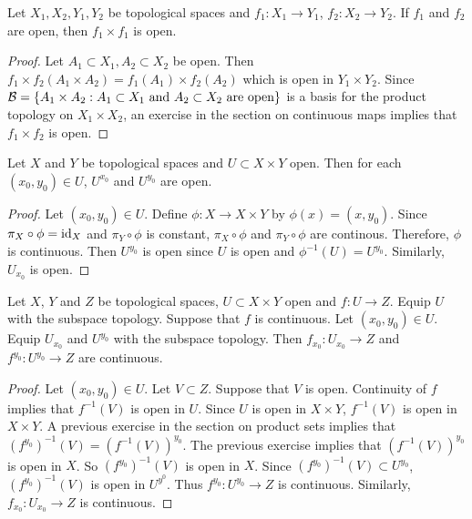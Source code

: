 \documentclass{book}
\begin{document}
	
	\begin{ex}
		Let $X_1, X_2,Y_1,Y_2$ be topological spaces and $f_1:X_1 \rightarrow Y_1$, $f_2:X_2 \rightarrow Y_2$. If $f_1$ and $f_2$ are open, then $f_1 \times f_1$ is open.
	\end{ex}
	
	\begin{proof}
		Let $A_1 \subset X_1, A_2 \subset X_2$ be open. Then $f_1 \times f_2(A_1 \times A_2) = f_1(A_1) \times f_2(A_2)$ which is open in $Y_1 \times Y_2$. Since $\mathcal{B} = \{A_1 \times A_2:  \text{$A_1 \subset X_1$ and $A_2 \subset X_2$ are open} \}$ is a basis for the product topology on $X_1 \times X_2$, an exercise in the section on continuous maps implies that $f_1 \times f_2$ is open.
	\end{proof}
	
	\begin{ex}
		Let $X$ and $Y$ be topological spaces and $U \subset X \times Y$ open. Then for each $(x_0,  y_0) \in U$, $U^{x_0}$ and $U^{y_0}$ are open.
	\end{ex}
	
	\begin{proof}
		Let $(x_0, y_0) \in U$. Define $\phi: X \rightarrow X \times Y$ by $\phi(x) = (x, y_0)$. Since $\pi_X \circ \phi = \operatorname{id}_X$ and $\pi_Y \circ \phi$ is constant, $\pi_X \circ \phi$ and $\pi_Y \circ \phi$ are continous. Therefore, $\phi$ is continuous. Then $U^{y_0}$ is open since $U$ is open and $\phi^{-1}(U) = U^{y_0}$. Similarly, $U_{x_0}$ is open.
	\end{proof}
	
	\begin{ex}
		Let $X$, $Y$ and $Z$ be topological spaces, $U \subset X \times Y$ open and $f: U \rightarrow Z$. Equip $U$ with the subspace topology. Suppose that $f$ is continuous. Let $(x_0, y_0) \in U$. Equip $U_{x_0}$ and $U^{y_0}$ with the subspace topology. Then $f_{x_0}:U_{x_0} \rightarrow Z$ and $f^{y_0}: U^{y_0} \rightarrow Z$ are continuous.
	\end{ex}
	
	\begin{proof}
		Let $(x_0, y_0) \in U$. Let $V \subset Z$. Suppose that $V$ is open. Continuity of $f$ implies that $f^{-1}(V)$ is open in $U$. Since $U$ is open in $X \times Y$, $f^{-1}(V)$ is open in $X \times Y$. A previous exercise in the section on product sets implies that $(f^{y_0})^{-1}(V) = (f^{-1}(V))^{y_0}$. The previous exercise implies that $(f^{-1}(V))^{y_0}$ is open in $X$. So $(f^{y_0})^{-1}(V)$ is open in $X$. Since $(f^{y_0})^{-1}(V) \subset U^{y_0}$, $(f^{y_0})^{-1}(V)$ is open in $U^{y^0}$. Thus $f^{y_0}: U^{y_0} \rightarrow Z$ is continuous. Similarly, $f_{x_0}: U_{x_0} \rightarrow Z$ is continuous.
	\end{proof}
\end{document}

